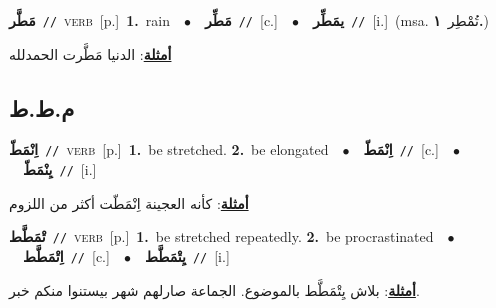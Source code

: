 \documentclass[10pt,a4paper,twoside]{article} %
\begin{document}
\begin{multicols}{2}
{\setlength\topsep{0pt}\textbf{\foreignlanguage{arabic}{مَطَّر}}\ {\color{gray}\texttt{//}\color{black}}\ \textsc{verb}\ [p.]\ \textbf{1.}~rain\ \ $\bullet$\ \ \setlength\topsep{0pt}\textbf{\foreignlanguage{arabic}{مَطِّر}}\ {\color{gray}\texttt{//}\color{black}}\ [c.]\ \ $\bullet$\ \ \setlength\topsep{0pt}\textbf{\foreignlanguage{arabic}{يمَطِّر}}\ {\color{gray}\texttt{//}\color{black}}\ [i.]\ \color{gray}(msa. \foreignlanguage{arabic}{تُمْطِر}~\foreignlanguage{arabic}{\textbf{١.}})\color{black}\  \begin{flushright}\color{gray}\foreignlanguage{arabic}{\textbf{\underline{\foreignlanguage{arabic}{أمثلة}}}: الدنيا مَطَّرت الحمدلله}\end{flushright}\color{black}} \vspace{2mm}

\vspace{-3mm}
\subsection*{\color{blue}\foreignlanguage{arabic}{م.ط.ط}\color{blue}{}} 

{\setlength\topsep{0pt}\textbf{\foreignlanguage{arabic}{اِنْمَطّ}}\ {\color{gray}\texttt{//}\color{black}}\ \textsc{verb}\ [p.]\ \textbf{1.}~be stretched.  \textbf{2.}~be elongated\ \ $\bullet$\ \ \setlength\topsep{0pt}\textbf{\foreignlanguage{arabic}{اِنْمَطّ}}\ {\color{gray}\texttt{//}\color{black}}\ [c.]\ \ $\bullet$\ \ \setlength\topsep{0pt}\textbf{\foreignlanguage{arabic}{يِنْمَطّ}}\ {\color{gray}\texttt{//}\color{black}}\ [i.]\  \begin{flushright}\color{gray}\foreignlanguage{arabic}{\textbf{\underline{\foreignlanguage{arabic}{أمثلة}}}: كأنه العجينة اِنْمَطّت أكثر من اللزوم}\end{flushright}\color{black}} \vspace{2mm}

{\setlength\topsep{0pt}\textbf{\foreignlanguage{arabic}{تْمَطَّط}}\ {\color{gray}\texttt{//}\color{black}}\ \textsc{verb}\ [p.]\ \textbf{1.}~be stretched repeatedly.  \textbf{2.}~be procrastinated\ \ $\bullet$\ \ \setlength\topsep{0pt}\textbf{\foreignlanguage{arabic}{اِتْمَطَّط}}\ {\color{gray}\texttt{//}\color{black}}\ [c.]\ \ $\bullet$\ \ \setlength\topsep{0pt}\textbf{\foreignlanguage{arabic}{يِتْمَطَّط}}\ {\color{gray}\texttt{//}\color{black}}\ [i.]\  \begin{flushright}\color{gray}\foreignlanguage{arabic}{\textbf{\underline{\foreignlanguage{arabic}{أمثلة}}}: بلاش يِتْمَطَّط بالموضوع. الجماعة صارلهم شهر بيستنوا منكم خبر.}\end{flushright}\color{black}} \vspace{2mm}


\end{multicols}
\end{document}
